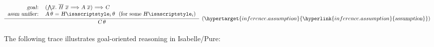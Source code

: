 \begin{isabellebody}
\begin{isamarkuptext}
  \medskip

  \[
  \infer[(\indexdef{}{inference}{assumption}\hypertarget{inference.assumption}{\hyperlink{inference.assumption}{\mbox{\isa{assumption}}}})]{\isa{{\isachardoublequote}C{\isasymvartheta}{\isachardoublequote}}}
  {\begin{tabular}{rl}
    \isa{{\isachardoublequote}goal{\isacharcolon}{\isachardoublequote}} &
    \isa{{\isachardoublequote}{\isacharparenleft}{\isasymAnd}\isactrlvec x{\isachardot}\ \isactrlvec H\ \isactrlvec x\ {\isasymLongrightarrow}\ A\ \isactrlvec x{\isacharparenright}\ {\isasymLongrightarrow}\ C{\isachardoublequote}} \\
    \isa{{\isachardoublequote}assm\ unifier{\isacharcolon}{\isachardoublequote}} & \isa{{\isachardoublequote}A{\isasymvartheta}\ {\isacharequal}\ H\isactrlsub i{\isasymvartheta}{\isachardoublequote}}~~\text{(for some~\isa{{\isachardoublequote}H\isactrlsub i{\isachardoublequote}})} \\
   \end{tabular}}
  \]

  The following trace illustrates goal-oriented reasoning in
  Isabelle/Pure:


\end{isamarkuptext}
\end{isabellebody}

